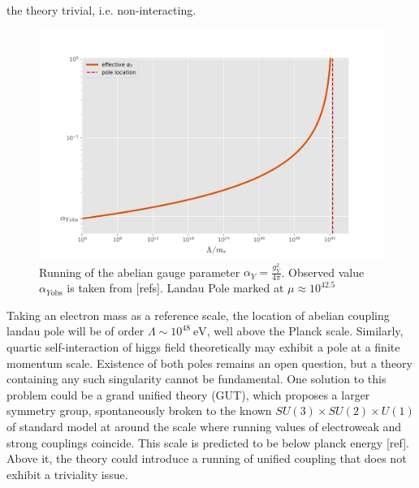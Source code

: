\documentclass[11pt, a4paper]{article}
\begin{document}
the theory trivial, i.e. non-interacting.
\begin{figure}[H]
    \includegraphics[width=1\textwidth]{./figures/plotr.jpg}
    \caption{Running of the abelian gauge parameter $\alpha_Y = \frac{g_Y^2}{4\pi}$. Observed value $\alpha_{Y\text{obs}}$ is taken from [refs]. 
    Landau Pole marked at $\mu \approx 10^{42.5}$}
    \label{boxes}
\end{figure} 
Taking an electron mass as a reference scale, the location of abelian coupling landau pole will be of order $\Lambda \sim 10^{48} \ \text{eV}$, well above the Planck scale.
Similarly, quartic self-interaction of higgs field theoretically may exhibit a pole at a finite momentum scale.
Existence of both poles remains an open question, but a theory containing any such singularity cannot be fundamental.
One solution to this problem could be a grand unified theory (GUT), which proposes a larger symmetry group, spontaneously broken
to the known $SU(3)\times SU(2) \times U(1)$ of standard model at around the scale where running values of electroweak and strong couplings
coincide. This scale is predicted to be below planck energy [ref]. Above it, the theory could introduce
a running of unified coupling that does not exhibit a triviality issue.
\end{document}
